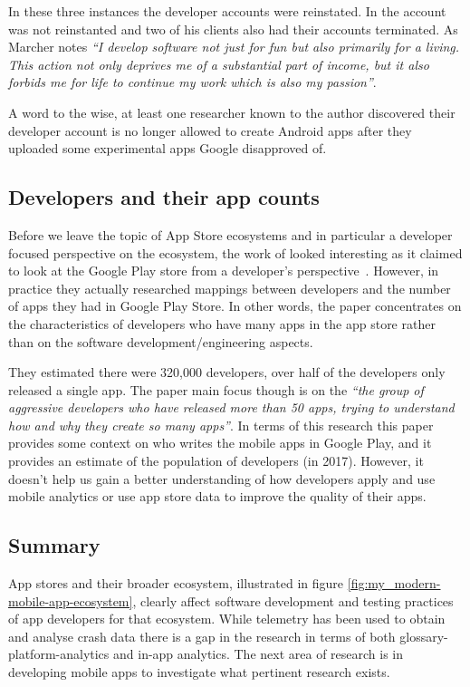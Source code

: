 In these three instances the developer accounts were reinstated. In \textcite{marcher2021_how_google_terminated-a-developer} the account was not reinstanted and two of his clients also had their accounts terminated. As Marcher notes \emph{``I develop software not just for fun but also primarily for a living. This action not only deprives me of a substantial part of income, but it also forbids me for life to continue my work which is also my passion''}. %

A word to the wise, at least one researcher known to the author discovered their developer account is no longer allowed to create Android apps after they uploaded some experimental apps Google disapproved of.

\subsection{Developers and their app counts}
Before we leave the topic of App Store ecosystems and in particular a developer focused perspective on the ecosystem, the work of \citeauthor{wang2017_exploratory_study_of_the_mobile_app_ecosystem} looked interesting as it claimed to look at the Google Play store from a developer's perspective~. However, in practice they actually researched mappings between developers and the number of apps they had in Google Play Store. In other words, the paper concentrates on the characteristics of developers who have many apps in the app store rather than on the software development/engineering aspects.

They estimated there were 320,000 developers, over half of the developers only released a single app. The paper main focus though is on the \emph{``the group of aggressive developers who have released more than 50 apps, trying to understand how and why they create so many apps''}. In terms of this research this paper provides some context on who writes the mobile apps in Google Play, and it provides an estimate of the population of developers (in 2017). However, it doesn't help us gain a better understanding of how developers apply and use mobile analytics or use app store data to improve the quality of their apps.

\subsection{Summary} %
App stores and their broader ecosystem, illustrated in figure \ref{fig:my_modern-mobile-app-ecosystem}, clearly affect software development and testing practices of app developers for that ecosystem. While telemetry has been used to obtain and analyse crash data there is a gap in the research in terms of both \gls{glossary-platform-analytics} and in-app analytics. The next area of research is in developing mobile apps to investigate what pertinent research exists. 


